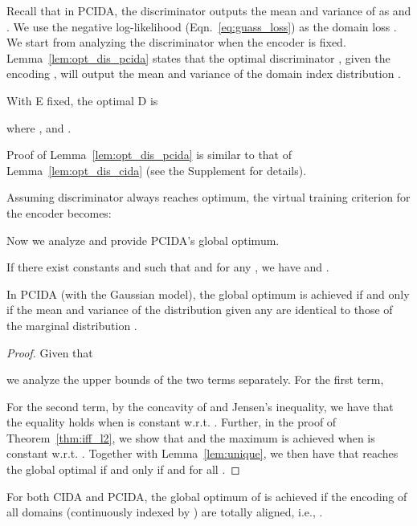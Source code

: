 \documentclass{article}
\newcommand{\lemref}[1]{Lemma~\ref{#1}}
\newcommand{\thmref}[1]{Theorem~\ref{#1}}
\newcommand{\eqnref}[1]{Eqn.~\ref{#1}}
\begin{document}
Recall that in PCIDA, the discriminator  outputs the mean and variance of  as  and . We use the negative log-likelihood (\eqnref{eq:guass_loss}) as the domain loss . We start from analyzing the discriminator  when the encoder  is fixed. \lemref{lem:opt_dis_pcida} states that the optimal discriminator , given the encoding , will output the mean and variance of the domain index distribution  .

\begin{lemma}\label{lem:opt_dis_pcida} With E fixed, the optimal D is

where , and .
\end{lemma}
Proof of \lemref{lem:opt_dis_pcida} is similar to that of \lemref{lem:opt_dis_cida} (see the Supplement for details).


Assuming discriminator  always reaches optimum, the virtual training criterion  for the encoder becomes:

Now we analyze  and provide PCIDA's global optimum.

\begin{lemma}\label{lem:unique}
If there exist constants  and  such that  and  for any , we have  and .
\end{lemma}


\begin{theorem}\label{thm:iff_gaussian}
In PCIDA (with the Gaussian model), the global optimum is achieved if and only if the mean and variance of the distribution  given any  are identical to those of the marginal distribution .
\end{theorem}

\begin{proof}
Given that

we analyze the upper bounds of the two terms separately.
For the first term, 
\begingroup\makeatletter\def\f@size{9}\check@mathfonts

\endgroup
For the second term, by the concavity of  and Jensen's inequality, we have that  the equality holds when  is constant w.r.t. . Further, in the proof of \thmref{thm:iff_l2}, we show that  and the maximum is achieved when  is constant w.r.t. . 
Together with \lemref{lem:unique}, we then have that  reaches the global optimal  if and only if  and  for all .
\end{proof}

\begin{cor}\label{thm:achieve_cida}
For both CIDA and PCIDA, the global optimum of  is achieved if the encoding of all domains (continuously indexed by ) are totally aligned, i.e., .
\end{cor}
\end{document}
